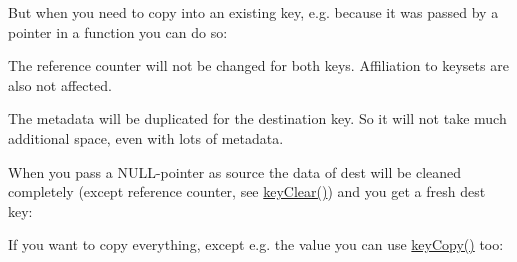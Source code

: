 But when you need to copy into an existing key, e.\+g. because it was passed by a pointer in a function you can do so\+:


\begin{DoxyCodeInclude}{0}
\DoxyCodeLine{\{}
\DoxyCodeLine{        \textcolor{comment}{// receive key c}}
\DoxyCodeLine{        \textcolor{comment}{// the caller will see the changed key k}}
\DoxyCodeLine{\}}
\end{DoxyCodeInclude}
 The reference counter will not be changed for both keys. Affiliation to keysets are also not affected.

The metadata will be duplicated for the destination key. So it will not take much additional space, even with lots of metadata.

When you pass a N\+U\+L\+L-\/pointer as source the data of dest will be cleaned completely (except reference counter, see \mbox{\hyperlink{group__key_gab2242311a36bbc0520e0d36895107ec1}{key\+Clear()}}) and you get a fresh dest key\+:


\begin{DoxyCodeInclude}{0}
\DoxyCodeLine{\{}
\DoxyCodeLine{        \textcolor{comment}{// k is now an empty and fresh key}}
\DoxyCodeLine{\}}
\end{DoxyCodeInclude}
 If you want to copy everything, except e.\+g. the value you can use \mbox{\hyperlink{group__key_ga6a12cbbe656a1ad9f41b8c681d7a2f92}{key\+Copy()}} too\+:


